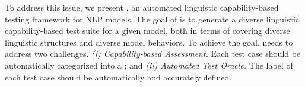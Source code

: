 





To address this issue, we present \tool,
an automated linguistic capability-based testing framework for NLP models.  
The goal of \tool is to generate a diverse linguistic capability-based test suite for a given model, both in terms of covering diverse linguistic structures and diverse model behaviors.
To achieve the goal, \tool needs to address two challenges.
\textit{(i) Capability-based Assessment.} Each test case should be automatically categorized into a \lc;
and \textit{(ii) Automated Test Oracle.} The label of each test case should be automatically
  and accurately defined.


